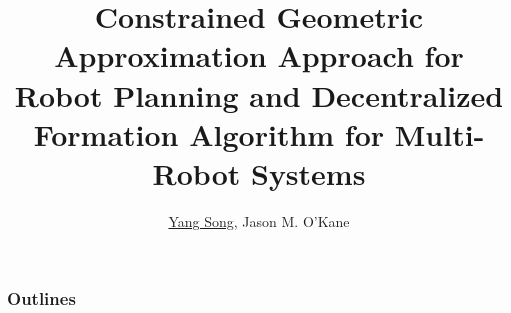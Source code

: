 \usepackage[tikz]{bclogo}

\newcommand{\id}{{\rm id}}
\newcommand{\edge}[3]{{#1}\overset{#2}{\longrightarrow}{#3}}
\renewcommand{\L}{{\Lambda}}
\newcommand{\chref}[2]{%
  \href{#1}{{\usebeamercolor[bg]{AAUsimple}#2}}%
}

\title{Constrained Geometric Approximation Approach for Robot Planning and
  Decentralized Formation Algorithm for Multi-Robot Systems}

\author{
  \underline{Yang Song}, Jason M. O'Kane %
}






\begin{frame}[plain] %
  \titlepage
\end{frame}
\begin{frame}
  \frametitle{Outlines}
  \tableofcontents[]
\end{frame}

